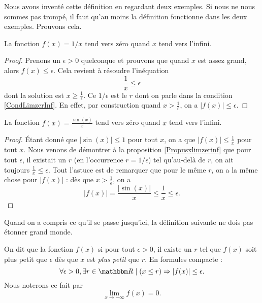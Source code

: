 Nous avons inventé cette définition en regardant deux exemples. Si nous ne nous sommes pas trompé, il faut qu'au moins la définition fonctionne dans les deux exemples. Prouvons cela.

\begin{proposition}		\label{Propusxlimzerinf}
La fonction $f(x)=1/x$ tend vers zéro quand $x$ tend vers l'infini.
\end{proposition}

\begin{proof}
Prenons un $\epsilon>0$ quelconque et prouvons que quand $x$ est assez grand, alors $f(x)\leq\epsilon$. Cela revient à résoudre l'inéquation
\[ 
  \frac{ 1 }{ x }\leq\epsilon
\]
dont la solution est $x\geq \frac{1}{ \epsilon }$. Ce $1/\epsilon$ est le $r$ dont on parle dans la condition \eqref{CondLimzerInf}. En effet, par construction quand $x>\frac{1}{ \epsilon }$, on a $| f(x) |\leq\epsilon$.
\end{proof}


\begin{proposition}
La fonction $f(x)=\frac{ \sin(x) }{ x }$ tend vers zéro quand $x$ tend vers l'infini.
\end{proposition}

\begin{proof}
Étant donné que $| \sin(x) |\leq 1$ pour tout $x$, on a que $| f(x) |\leq \frac{ 1 }{ x }$ pour tout $x$. Nous venons de démontrer à la proposition \ref{Propusxlimzerinf} que pour tout $\epsilon$, il existait un $r$ (en l'occurrence $r=1/\epsilon$) tel qu'au-delà de $r$, on ait toujours $\frac{1}{ x }\leq\epsilon$. Tout l'astuce est de remarquer que pour le même $r$, on a la même chose pour $| f(x) |$ : dès que $x>\frac{ 1 }{ \epsilon }$, on a
\[ 
  | f(x) |=\frac{ |\sin(x)| }{ x }\leq \frac{1}{ x }\leq \epsilon.
\]
\end{proof}

Quand on a compris ce qu'il se passe jusqu'ici, la définition suivante ne dois pas étonner grand monde.

\begin{definition}
On dit que la fonction $f(x)$  si pour tout $\epsilon>0$, il existe un $r$ tel que $f(x)$ soit plus petit que $\epsilon$ dès que $x$ est \emph{plus petit} que $r$. En formules compacte :
\begin{equation}
\forall\epsilon>0,\exists r\in\eR\tq (x\leq r)\Rightarrow | f(x) |\leq \epsilon.
\end{equation}
Nous noterons ce fait par
\begin{equation}
\lim_{x\to-\infty}f(x)=0.
\end{equation}

\end{definition}

